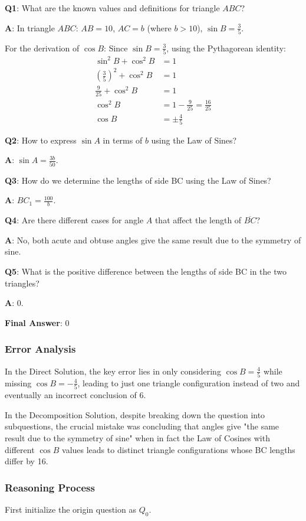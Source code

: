 \textbf{Q1}: What are the known values and definitions for triangle $ABC$?

\textbf{A}: In triangle $ABC$: $AB = 10$, $AC = b$ (where $b > 10$), $\sin B = \frac{3}{5}$.

For the derivation of $\cos B$:
Since $\sin B = \frac{3}{5}$, using the Pythagorean identity:
\begin{align*}
\sin^2 B + \cos^2 B &= 1 \\
(\frac{3}{5})^2 + \cos^2 B &= 1 \\
\frac{9}{25} + \cos^2 B &= 1 \\
\cos^2 B &= 1 - \frac{9}{25} = \frac{16}{25} \\
\cos B &= \pm\frac{4}{5}
\end{align*}

\textbf{Q2}: How to express $\sin A$ in terms of $b$ using the Law of Sines?

\textbf{A}: $\sin A = \frac{3b}{50}$.

\textbf{Q3}: How do we determine the lengths of side BC using the Law of Sines?

\textbf{A}: $BC_1 = \frac{100}{b}$.

\textbf{Q4}: Are there different cases for angle $A$ that affect the length of $\overline{BC}$?

\textbf{A}: No, both acute and obtuse angles give the same result due to the symmetry of sine.

\textbf{Q5}: What is the positive difference between the lengths of side BC in the two triangles?

\textbf{A}: $0$.

\textbf{Final Answer}: $0$

\subsubsection*{Error Analysis}
In the Direct Solution, the key error lies in only considering $\cos B = \frac{4}{5}$ while missing $\cos B = -\frac{4}{5}$, leading to just one triangle configuration instead of two and eventually an incorrect conclusion of 6.

In the Decomposition Solution, despite breaking down the question into subquestions, the crucial mistake was concluding that angles give "the same result due to the symmetry of sine" when in fact the Law of Cosines with different $\cos B$ values leads to distinct triangle configurations whose BC lengths differ by 16.

\subsubsection*{\our Reasoning Process}
First initialize the origin question as $Q_0$.

